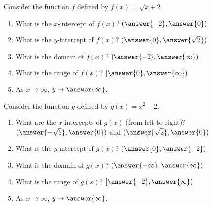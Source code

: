 \documentclass{ximera}
\author{Kenneth Berglund}
\begin{document}
\begin{exercise}
Consider the function $f$ defined by $f(x) = \sqrt{x + 2}$.
\begin{enumerate}
\item What is the $x$-intercept of $f(x)$? $(\answer{-2}, \answer{0})$
\item What is the $y$-intercept of $f(x)$? $(\answer{0}, \answer{\sqrt{2}})$
\item What is the domain of $f(x)$? $[\answer{-2}, \answer{\infty})$
\item What is the range of $f(x)$? $[\answer{0}, \answer{\infty})$
\item As $x \to \infty$, $y \to \answer{\infty}$.
\end{enumerate}

\end{exercise}

\begin{exercise}
Consider the function $g$ defined by $g(x) = x^2 - 2$.
\begin{enumerate}
\item What are the $x$-intercepts of $g(x)$ (from left to right)? $(\answer{-\sqrt{2}}, \answer{0})$ and $(\answer{\sqrt{2}}, \answer{0})$
\item What is the $y$-intercept of $g(x)$? $(\answer{0}, \answer{-2})$
\item What is the domain of $g(x)$? $(\answer{-\infty}, \answer{\infty})$
\item What is the range of $g(x)$? $[\answer{-2}, \answer{\infty})$
\item As $x \to \infty$, $y \to \answer{\infty}$.
\end{enumerate}

\end{exercise}
\end{document}

